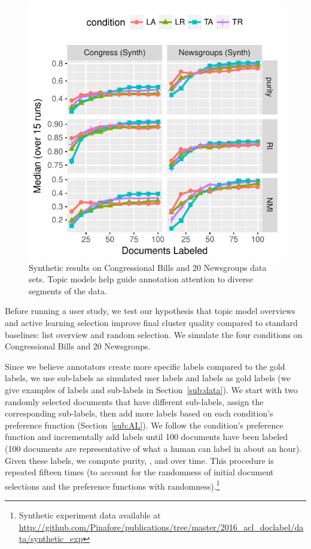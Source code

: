 
 
\begin{figure}[t!]
\includegraphics[width=\linewidth]{2016_acl_doclabel/auto_fig/synthetic}
\caption{Synthetic results on  Congressional
  Bills and 20 Newsgroups data sets.  Topic models help guide annotation
  attention to diverse segments of the data.}
\label{fig:syn_results}
\end{figure}
Before running a user study, we test our hypothesis that topic
model overviews and active learning selection improve final cluster quality compared to standard baselines: list overview and random
selection. We simulate the four conditions on Congressional
Bills and 20 Newsgroups.

Since we believe annotators create more specific labels compared to the gold
labels, we use sub-labels as simulated user labels and labels as gold labels (we
give examples of labels and sub-labels in Section~\ref{sub:data}). We start with
two randomly selected documents that have different sub-labels, assign the
corresponding sub-labels, then add more labels based on each condition's
preference function (Section~\ref{sub:AL}).  We follow the condition's
preference function and incrementally add labels until 100 documents have been
labeled (100 documents are representative of what a human can label in about an
hour).  Given these labels, we compute purity, , and  over
time. This procedure is repeated fifteen times (to account for the randomness of
initial document selections and the preference functions with
randomness).\footnote{Synthetic experiment data available at
\let\hyper@linkurl\saved@hyper@linkurl
  \url{http://github.com/Pinafore/publications/tree/master/2016_acl_doclabel/data/synthetic_exp}
  \NoHyper
  }

